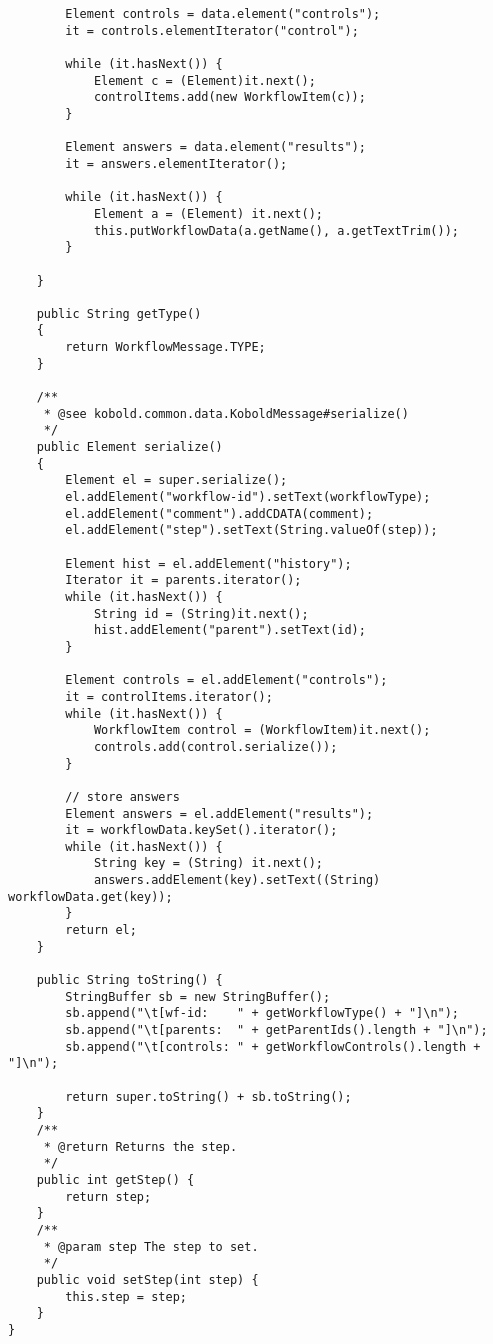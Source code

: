 \begin{verbatim}
		Element controls = data.element("controls");
		it = controls.elementIterator("control");

		while (it.hasNext()) {
			Element c = (Element)it.next();
			controlItems.add(new WorkflowItem(c));
		}
		
		Element answers = data.element("results");
		it = answers.elementIterator();
		
		while (it.hasNext()) {
			Element a = (Element) it.next();
			this.putWorkflowData(a.getName(), a.getTextTrim());
		}

	}

	public String getType() 
	{
		return WorkflowMessage.TYPE;
	}

	/**
	 * @see kobold.common.data.KoboldMessage#serialize()
	 */
	public Element serialize() 
	{
		Element el = super.serialize();
		el.addElement("workflow-id").setText(workflowType);
		el.addElement("comment").addCDATA(comment);
		el.addElement("step").setText(String.valueOf(step));
		
		Element hist = el.addElement("history");
		Iterator it = parents.iterator();
		while (it.hasNext()) {
			String id = (String)it.next();
			hist.addElement("parent").setText(id);
		}
		
		Element controls = el.addElement("controls");
		it = controlItems.iterator();
		while (it.hasNext()) {
			WorkflowItem control = (WorkflowItem)it.next();
			controls.add(control.serialize());
		}
		
		// store answers
		Element answers = el.addElement("results");
		it = workflowData.keySet().iterator();
		while (it.hasNext()) {
			String key = (String) it.next();
			answers.addElement(key).setText((String) workflowData.get(key));
		}
		return el;
	}

	public String toString() {
		StringBuffer sb = new StringBuffer();
		sb.append("\t[wf-id:    " + getWorkflowType() + "]\n");
		sb.append("\t[parents:  " + getParentIds().length + "]\n");
		sb.append("\t[controls: " + getWorkflowControls().length + "]\n");

		return super.toString() + sb.toString(); 
	}
	/**
	 * @return Returns the step.
	 */
	public int getStep() {
		return step;
	}
	/**
	 * @param step The step to set.
	 */
	public void setStep(int step) {
		this.step = step;
	}
}   
   


\end{verbatim}